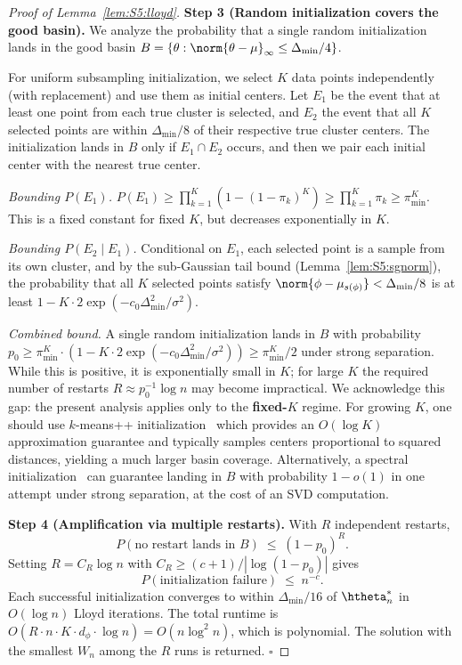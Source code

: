 \begin{proof}[Proof of Lemma~\ref{lem:S5:lloyd}]
\noindent\textbf{Step 3 (Random initialization covers the good basin).}
We analyze the probability that a single random initialization lands in
the good basin $B=\{\theta:\norm{\theta-\mu}_\infty\le\Delta_{\min}/4\}$.

For uniform subsampling initialization, we select $K$ data points
independently (with replacement) and use them as initial centers.  Let
$E_1$ be the event that at least one point from each true cluster is
selected, and $E_2$ the event that all $K$ selected points are within
$\Delta_{\min}/8$ of their respective true cluster centers.  The
initialization lands in $B$ only if $E_1\cap E_2$ occurs, and then we
pair each initial center with the nearest true center.

\noindent\textit{Bounding $P(E_1)$.}
$P(E_1)\ge\prod_{k=1}^K (1-(1-\pi_k)^K)\ge\prod_{k=1}^K\pi_k
\ge\pi_{\min}^K$.  This is a fixed constant for fixed $K$, but
decreases exponentially in $K$.

\noindent\textit{Bounding $P(E_2\mid E_1)$.}
Conditional on $E_1$, each selected point is a sample from its own
cluster, and by the sub-Gaussian tail bound (Lemma~\ref{lem:S5:sgnorm}),
the probability that all $K$ selected points satisfy
$\norm{\phi-\mu_{s(\phi)}}<\Delta_{\min}/8$ is at least
$1-K\cdot 2\exp(-c_0\Delta_{\min}^2/\sigma^2)$.

\noindent\textit{Combined bound.}
A single random initialization lands in $B$ with probability
$p_0\ge\pi_{\min}^K\cdot(1-K\cdot 2\exp(-c_0\Delta_{\min}^2/\sigma^2))
\ge\pi_{\min}^K/2$ under strong separation.  While this is positive,
it is exponentially small in $K$; for large $K$ the required number of
restarts $R\approx p_0^{-1}\log n$ may become impractical.  We
acknowledge this gap: the present analysis applies only to the
\textbf{fixed-$K$} regime.  For growing $K$, one should use
$k$-means++ initialization~\cite{arthur2007kmeanspp} which provides an
$O(\log K)$ approximation guarantee and typically samples centers
proportional to squared distances, yielding a much larger basin coverage.
Alternatively, a spectral initialization~\cite{kumar2010clustering}
can guarantee landing in $B$ with probability $1-o(1)$ in one attempt
under strong separation, at the cost of an SVD computation.

\noindent\textbf{Step 4 (Amplification via multiple restarts).}
With $R$ independent restarts,
\[
P(\text{no restart lands in }B) \;\le\; (1-p_0)^R.
\]
Setting $R=C_R\log n$ with $C_R\ge(c+1)/|\log(1-p_0)|$ gives
\[
P(\text{initialization failure}) \;\le\; n^{-c}.
\]
Each successful initialization converges to within $\Delta_{\min}/16$ of
$\htheta_n^*$ in $O(\log n)$ Lloyd iterations.  The total runtime is
$O(R\cdot n\cdot K\cdot d_\phi\cdot\log n)=O(n\log^2 n)$, which is
polynomial.  The solution with the smallest $W_n$ among the $R$ runs is
returned. \hfill$\square$
\end{proof}

